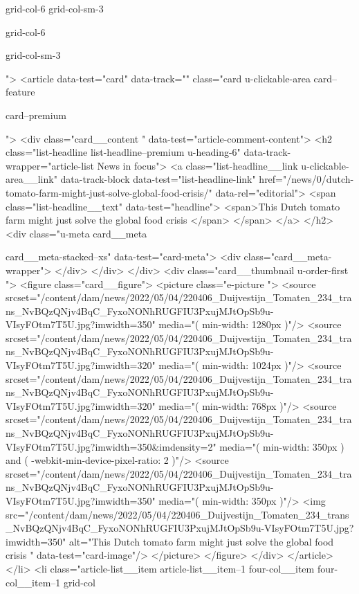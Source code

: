 {{{			
			grid-col-6 grid-col-sm-3
			
			grid-col-6
			
			
			
			
			
			grid-col-sm-3
			
			
			
			
			
			
			
			
			">
<article data-test="card" data-track="" class="card
			u-clickable-area
			card--feature
			
			card--premium
			
			
			
			
			
			 ">
<div class="card__content " data-test="article-comment-content">
<h2 class="list-headline list-headline--premium u-heading-6" data-track-wrapper="article-list News in focus">
<a class="list-headline__link u-clickable-area__link" data-track-block data-test="list-headline-link" href="/news/0/dutch-tomato-farm-might-just-solve-global-food-crisis/" data-rel="editorial">
<span class="list-headline__text" data-test="headline">
<span>This Dutch tomato farm might just solve the global food crisis </span>
</span>
</a>
</h2>
<div class="u-meta card__meta
						
						
						card__meta-stacked--xs" data-test="card-meta">
<div class="card__meta-wrapper">
</div>
</div>
</div>
<div class="card__thumbnail u-order-first ">
<figure class="card__figure">
<picture class="e-picture   ">
<source srcset="/content/dam/news/2022/05/04/220406_Duijvestijn_Tomaten_234_trans_NvBQzQNjv4BqC_FyxoNONhRUGFIU3PxujMJtOpSb9u-VIsyFOtm7T5U.jpg?imwidth=350" media="( min-width: 1280px )"/>
<source srcset="/content/dam/news/2022/05/04/220406_Duijvestijn_Tomaten_234_trans_NvBQzQNjv4BqC_FyxoNONhRUGFIU3PxujMJtOpSb9u-VIsyFOtm7T5U.jpg?imwidth=320" media="( min-width: 1024px )"/>
<source srcset="/content/dam/news/2022/05/04/220406_Duijvestijn_Tomaten_234_trans_NvBQzQNjv4BqC_FyxoNONhRUGFIU3PxujMJtOpSb9u-VIsyFOtm7T5U.jpg?imwidth=320" media="( min-width: 768px )"/>
<source srcset="/content/dam/news/2022/05/04/220406_Duijvestijn_Tomaten_234_trans_NvBQzQNjv4BqC_FyxoNONhRUGFIU3PxujMJtOpSb9u-VIsyFOtm7T5U.jpg?imwidth=350&imdensity=2" media="( min-width: 350px ) and ( -webkit-min-device-pixel-ratio: 2 )"/>
<source srcset="/content/dam/news/2022/05/04/220406_Duijvestijn_Tomaten_234_trans_NvBQzQNjv4BqC_FyxoNONhRUGFIU3PxujMJtOpSb9u-VIsyFOtm7T5U.jpg?imwidth=350" media="( min-width: 350px )"/>
<img src="/content/dam/news/2022/05/04/220406_Duijvestijn_Tomaten_234_trans_NvBQzQNjv4BqC_FyxoNONhRUGFIU3PxujMJtOpSb9u-VIsyFOtm7T5U.jpg?imwidth=350" alt="This Dutch tomato farm might just solve the global food crisis " data-test="card-image"/>
</picture>
</figure>
</div>
</article>
</li>
<li class="article-list__item article-list__item--1 four-col__item four-col__item--1
			grid-col
			
}}}
